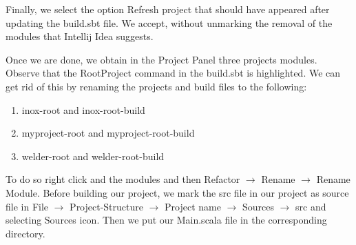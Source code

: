 Finally, we select the option Refresh project that should have appeared after updating the build.sbt file. We accept, without unmarking the removal of the modules that Intellij Idea suggests. 

Once we are done, we obtain in the Project Panel three projects modules. Observe that the RootProject command in the build.sbt is highlighted. We can get rid of this by renaming the projects and build files to the following:

\begin{enumerate}
\item inox-root and inox-root-build
\item myproject-root and myproject-root-build
\item welder-root and welder-root-build
\end{enumerate}

To do so right click and the modules and then Refactor $\to$ Rename $\to$ Rename Module. Before building our project, we mark the src file in our project as source file in File $\to$ Project-Structure $\to$ Project name $\to$ Sources $\to$ src and selecting Sources icon. Then we put our Main.scala file in the corresponding directory. 

\begin{figure}[H]
\centering
{}
\end{figure}

